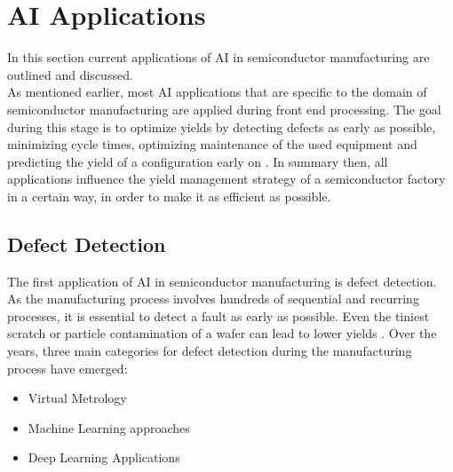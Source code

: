 \documentclass{Academic}
\begin{document}
    \section{AI Applications}
    In this section current applications of AI in semiconductor manufacturing are outlined and discussed.\\
    As mentioned earlier, most AI applications that are specific to the domain of semiconductor manufacturing are applied during front end processing. The goal during this stage is to optimize yields by detecting defects as early as possible, minimizing cycle times, optimizing maintenance of the used equipment and predicting the yield of a configuration early on \cite{batool_systematic_2021,wang_fuzzy_2021,jiang_novel_2020,irani_applying_1993,kim_machine_2012}. In summary then, all applications influence the yield management strategy of a semiconductor factory in a certain way, in order to make it as efficient as possible.

    \subsection{Defect Detection}
    The first application of AI in semiconductor manufacturing is defect detection. As the manufacturing process involves hundreds of sequential and recurring processes, it is essential to detect a fault as early as possible. Even the tiniest scratch or particle contamination of a wafer can lead to lower yields \cite{kim_machine_2012}. Over the years, three main categories for defect detection during the manufacturing process have emerged:
    \begin{itemize}
        \item Virtual Metrology
        \item Machine Learning approaches
        \item Deep Learning Applications
    \end{itemize}
\end{document}
